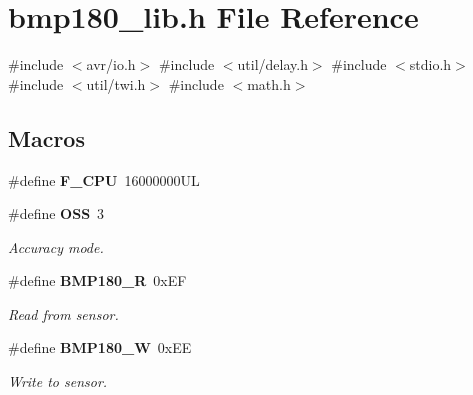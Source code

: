 \section{bmp180\+\_\+lib.\+h File Reference}
\label{bmp180__lib_8h}
{\ttfamily \#include $<$avr/io.\+h$>$}\newline
{\ttfamily \#include $<$util/delay.\+h$>$}\newline
{\ttfamily \#include $<$stdio.\+h$>$}\newline
{\ttfamily \#include $<$util/twi.\+h$>$}\newline
{\ttfamily \#include $<$math.\+h$>$}\newline
\subsection*{Macros}
\begin{DoxyCompactItemize}
\item 
\#define \textbf{ F\+\_\+\+C\+PU}~16000000\+UL
\item 
\#define \textbf{ O\+SS}~3
\begin{DoxyCompactList}\small\item\em Accuracy mode. \end{DoxyCompactList}\item 
\#define \textbf{ B\+M\+P180\+\_\+R}~0x\+EF
\begin{DoxyCompactList}\small\item\em Read from sensor. \end{DoxyCompactList}\item 
\#define \textbf{ B\+M\+P180\+\_\+W}~0x\+EE
\begin{DoxyCompactList}\small\item\em Write to sensor. \end{DoxyCompactList}\end{DoxyCompactItemize}

